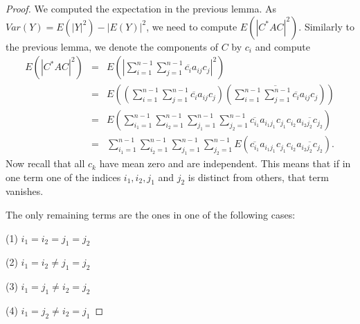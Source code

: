 \documentclass[12pt,a4paper,leqno]{report}
\theoremstyle{plain}
\theoremstyle{definition}
\theoremstyle{remark}
\begin{document}
\begin{proof}
We computed the expectation in the previous lemma. As $Var(Y) = E(|Y|^2)-|E(Y)|^2$, we need to compute $E(|C^* A C|^2)$. Similarly to the previous lemma, we denote the components of $C$ by $c_i$ and compute
\begin{eqnarray*}
E(|C^* A C|^2) & = & E(|\sum_{i=1}^{n-1} \sum_{j=1}^{n-1} \overline{c_i} a_{ij} c_j|^2)\\
& = & E((\sum_{i=1}^{n-1} \sum_{j=1}^{n-1} \overline{c_i} a_{ij} c_j)
(\overline{\sum_{i=1}^{n-1} \sum_{j=1}^{n-1} \overline{c_i} a_{ij} c_j}))\\
& = & E (\sum_{i_1=1}^{n-1}\sum_{i_2=1}^{n-1}
\sum_{j_1=1}^{n-1}\sum_{j_2=1}^{n-1} 
\overline{c_{i_1}} a_{i_1j_1} c_{j_1}c_{i_2} \overline{a_{i_2j_2} c_{j_2}})\\
& = & \sum_{i_1=1}^{n-1}\sum_{i_2=1}^{n-1}
\sum_{j_1=1}^{n-1}\sum_{j_2=1}^{n-1} 
E(\overline{c_{i_1}} a_{i_1j_1} c_{j_1}c_{i_2} \overline{a_{i_2j_2} c_{j_2}}).
\end{eqnarray*}
Now recall that all $c_k$ have mean zero and are independent. This means that if in one term one of the indices $i_1, i_2, j_1$ and $j_2$ is distinct from others, that term vanishes.

The only remaining terms are the ones in one of the following cases:

(1) $i_1 = i_2 = j_1 = j_2$

(2) $i_1=i_2 \neq j_1=j_2$

(3) $i_1 = j_1 \neq i_2 = j_2$

(4) $i_1 = j_2 \neq i_2 = j_1$


\end{proof}
\end{document}
